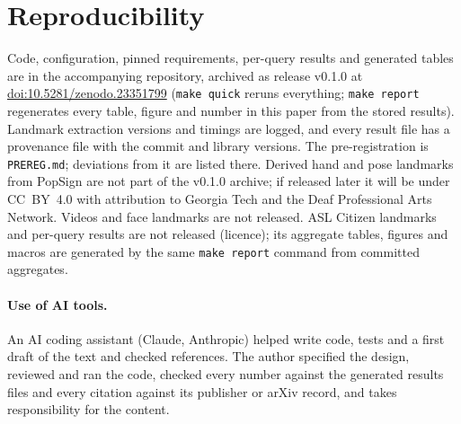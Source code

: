 \section{Reproducibility}
Code, configuration, pinned requirements, per-query results and generated tables are in the accompanying repository, archived as release v0.1.0 at
\href{https://doi.org/10.5281/zenodo.23351799}{doi:10.5281/zenodo.23351799} (\texttt{make quick} reruns everything; \texttt{make report} regenerates every table, figure and number in this paper
from the stored results). Landmark extraction versions and timings are logged, and every result file has a provenance file with
the commit and library versions. The pre-registration is \texttt{PREREG.md}; deviations from it are listed there.
Derived hand and pose landmarks from PopSign are not part of the v0.1.0 archive; if released later it will be under CC~BY~4.0 with attribution to Georgia Tech and the Deaf Professional Arts
Network. Videos and face landmarks are not released. ASL Citizen landmarks and per-query results are not released (licence); its aggregate tables, figures and macros are
generated by the same \texttt{make report} command from committed aggregates.

\paragraph{Use of AI tools.} An AI coding assistant (Claude, Anthropic) helped write code, tests and a first draft of the text
and checked references. The author specified the design, reviewed and ran the code, checked every number against the generated
results files and every citation against its publisher or arXiv record, and takes responsibility for the content.
